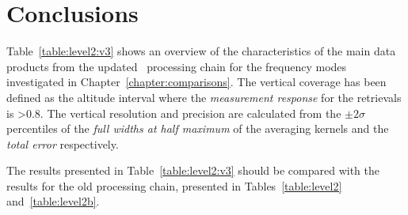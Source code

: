 \chapter{Conclusions}
\label{chapter:conclusions}
Table~\ref{table:level2:v3} shows an overview of the characteristics of the
main data products from the updated \smr\ processing chain for the frequency
modes investigated in Chapter~\ref{chapter:comparisons}. The vertical coverage
has been defined as the altitude interval where the \emph{measurement response}
for the retrievals is >0.8. The vertical resolution and precision are
calculated from the $\pm 2\sigma$ percentiles of the \emph{full widths at half
maximum} of the averaging kernels and the \emph{total error} respectively.

The results presented in Table~\ref{table:level2:v3} should be compared with
the results for the old processing chain, presented in
Tables~\ref{table:level2} and~\ref{table:level2b}.

